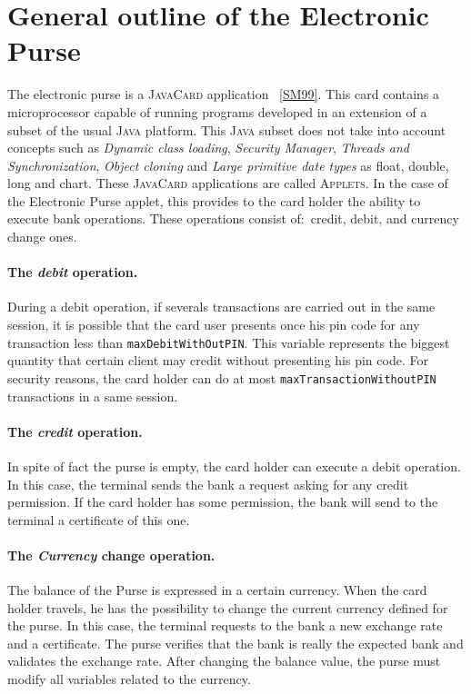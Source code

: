 \documentclass[a4paper]{llncs}
\begin{document}
\section{General outline of the Electronic Purse}
\label{SectGenPurse}

The electronic purse is a \textsc{JavaCard} application
~\ref{SM99}. This card contains a
microprocessor capable of running programs developed in an extension
of a subset of the usual \textsc{Java} platform. This \textsc{Java}
subset does not take into account concepts such as \textit{Dynamic
class loading}, \textit{Security Manager}, \textit{Threads and
Synchronization}, \textit{Object cloning} and \textit{Large primitive
date types} as float, double, long and chart. These
\textsc{JavaCard} applications are called \textsc{Applets}. In the
case of the Electronic Purse applet, this provides to
the card holder the ability to execute bank operations. These
operations consist of$:$ credit, debit, and currency
change ones.

\paragraph{\bf The \textit{debit} operation.} During a debit
operation, if severals transactions are carried out in the same
session, it is possible that
the card user presents once his pin code for any transaction less than
\texttt{maxDebitWithOutPIN}. This variable
represents the biggest quantity that certain client may credit without
presenting his pin code. For
security reasons, the card holder can do at most
\texttt{maxTransactionWithoutPIN} transactions in a same session. 



\paragraph{\bf The \textit{credit} operation.} In spite of fact
the purse is empty, the
card holder can execute a debit operation. In this case, the terminal
sends the bank a request asking for any credit permission. If the card 
holder has some permission, the bank will send to the terminal a
certificate of this one.



\paragraph{\bf The \textit{Currency} change operation.} The balance
of the Purse is expressed in a certain currency. When the card holder
travels, he has the possibility to
change the current currency defined for the purse. In this case, the
terminal requests to the bank a
new exchange rate and a certificate. The purse verifies that the bank is 
really the expected bank and validates the exchange rate. After
changing the balance value, the purse must modify all variables related
to the currency. \\
\end{document}
